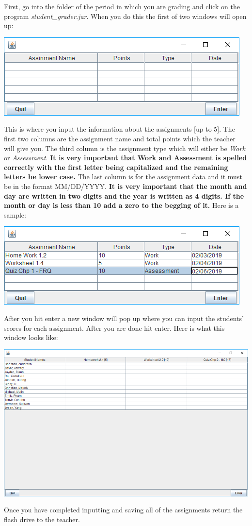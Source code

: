 \documentclass{article}
\begin{document}
\large

{\Large \bf \StrSubstitute{\jobname}{\detokenize{_}}{ }}

First, go into the folder of the period in which you are grading and click on the program {\em student\_grader.jar}. When you do this the first of two windows will open up:

\begin{center}
   \includegraphics[scale=0.5]{startup1.png}
\end{center}

This is where you input the information about the assignments [up to 5]. The first two columns are the assignment name and total points which the teacher will give you. The third column is the assignment type which will either be {\em Work} or {\em Assessment}. {\bf It is very important that Work and Assessment is spelled correctly with the first letter being capitalized and the remaining letters be lower case.} The last column is for the assignment data and it must be in the format MM/DD/YYYY. {\bf It is very important that the month and day are written in two digits and the year is written as 4 digits. If the month or day is less than 10 add a zero to the begging of it.} Here is a sample:

\begin{center}
   \includegraphics[scale=0.5]{startup2.png}
\end{center}

After you hit enter a new window will pop up where you can input the students' scores for each assignment. After you are done hit enter. Here is what this window looks like:

\begin{center}
    \includegraphics[scale=0.5]{scores.png}
 \end{center}

Once you have completed inputting and saving all of the assignments return the flash drive to the teacher.
\end{document}

